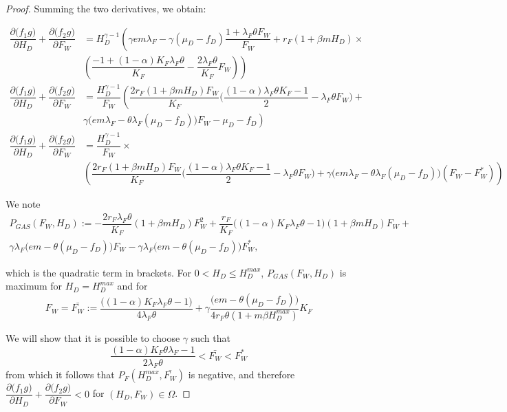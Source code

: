 \documentclass{article}
\newcommand{\lfw}{\lambda_{F}}
\newcommand{\lfw}{\lambda_{F}}
\begin{document}
\begin{proof}
Summing the two derivatives, we obtain:

\begin{align*}
\dfrac{\partial \Big(f_1 g \Big)}{\partial H_D} + \dfrac{\partial \Big(f_2 g \Big)}{\partial F_W} &= H_D^{\gamma - 1} \left( \gamma e m \lfw - \gamma (\mu_D - f_D) \dfrac{1 + \lfw \theta F_W}{F_W} + r_F(1 + \beta m H_D) \times \right. \\ & \left. \left(\dfrac{-1 + (1-\alpha)K_F \lfw \theta}{K_F}-  \dfrac{2 \lfw \theta}{K_F} F_W\right) \right) \\
\dfrac{\partial \Big(f_1 g \Big)}{\partial H_D} + \dfrac{\partial \Big(f_2 g \Big)}{\partial F_W} &= \dfrac{H_D^{\gamma - 1}}{F_W} \left( \dfrac{2 r_F(1+ \beta m H_D) F_W}{K_F} \Big(\dfrac{(1-\alpha)\lfw \theta K_F - 1}{2} - \lfw \theta F_W \Big) + \right. \\ & \left. \gamma \Big(e m \lfw - \theta \lfw(\mu_D - f_D) \Big) F_W - \mu_D - f_D \right) \\
\dfrac{\partial \Big(f_1 g \Big)}{\partial H_D} + \dfrac{\partial \Big(f_2 g \Big)}{\partial F_W} &=\dfrac{H_D^{\gamma - 1}}{F_W} \times \\&  \left( \dfrac{2 r_F(1+ \beta m H_D) F_W}{K_F} \Big(\dfrac{(1-\alpha) \lfw \theta K_F - 1}{2} - \lfw \theta F_W \Big) +  \gamma \Big(e m \lfw - \theta \lfw(\mu_D - f_D) \Big)( F_W - F_W^*) \right)
\end{align*}

We note 
\begin{multline}
P_{GAS}(F_W, H_D) := - \dfrac{2 r_F \lfw \theta}{K_F} (1 + \beta m H_D) F_W^2 + \dfrac{r_F}{K_F} \Big((1-\alpha)K_F \lfw \theta - 1\Big) (1 + \beta m H_D) F_W + \\ \gamma \lfw \Big(em - \theta (\mu_D - f_D)\Big) F_W - \gamma \lfw \Big(em - \theta (\mu_D - f_D)\Big) F_W^*,
\end{multline}

which is the quadratic term in brackets. For $0 < H_D \leq H_D^{max}$, $P_{GAS}(F_W, H_D)$ is maximum for $H_D = H_D^{max}$ and for
$$F_W = \bar{F_W} := \dfrac{ \Big((1-\alpha)K_F \lfw \theta - 1\Big)}{4 \lfw \theta} + \gamma \dfrac{\Big(em - \theta (\mu_D - f_D)\Big)}{4 r_F \theta (1 + m \beta H_D^{max})} K_F $$

We will show that it is possible to choose $\gamma$ such that \begin{equation}\label{inequalitiesGAS}
\dfrac{(1-\alpha) K_F \theta \lfw -1}{2 \lfw \theta} < \bar{F_W} < F_W^*
\end{equation} 
from which it follows that $P_F(H_D^{max}, \bar{F_W})$ is negative, and therefore $\dfrac{\partial \Big(f_1 g \Big)}{\partial H_D} + \dfrac{\partial \Big(f_2 g \Big)}{\partial F_W} < 0$ for $(H_D, F_W) \in \Omega$.


\end{proof}
\end{document}
